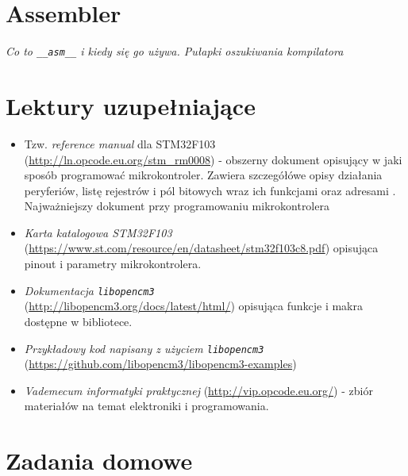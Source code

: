 \documentclass{pdfBooklets}
\begin{document}
\section{Assembler}
\textit{Co to \Verb$__asm__$ i kiedy się go używa. Pułapki oszukiwania kompilatora}


\section{Lektury uzupełniające}
\begin{itemize}

\item Tzw. \emph{reference manual} dla STM32F103 (\url{http://ln.opcode.eu.org/stm_rm0008}) - obszerny dokument opisujący w jaki sposób programować
  mikrokontroler. Zawiera szczegółówe opisy działania peryferiów, listę rejestrów i pól bitowych wraz ich funkcjami oraz
  adresami \footnotemark. Najważniejszy dokument przy programowaniu mikrokontrolera
  

\item \emph{Karta katalogowa STM32F103}\\ (\url{https://www.st.com/resource/en/datasheet/stm32f103c8.pdf}) opisująca pinout i
  parametry mikrokontrolera.

\item \emph{Dokumentacja \Verb$libopencm3$}\\ (\url{http://libopencm3.org/docs/latest/html/}) opisująca funkcje i makra dostępne
  w bibliotece.
  
\item \emph{Przykładowy kod napisany z użyciem \Verb$libopencm3$} (\url{https://github.com/libopencm3/libopencm3-examples}) 
  
\item \emph{Vademecum informatyki praktycznej} (\url{http://vip.opcode.eu.org/}) - zbiór materiałów na temat elektroniki i programowania.

\end{itemize}




\clearpage
\section{Zadania domowe}
\newtheorem{ZadanieDomowe}{Zadanie domowe}
\end{document}
